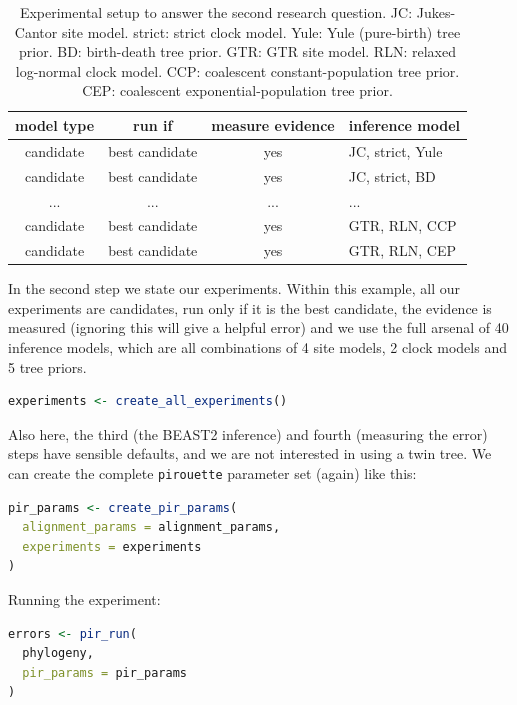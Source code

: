 \documentclass{article}
\begin{document}
\begin{table}
  \begin{tabular}{ | c | c | c | l | }
    \hline
    \textbf{model type} & \textbf{run if} & \textbf{measure evidence} & \textbf{inference model} \\ 
    \hline
    candidate & best candidate & yes & JC, strict, Yule \\
    candidate & best candidate & yes & JC, strict, BD \\
    ...       & ...            & ... & ... \\
    candidate & best candidate & yes & GTR, RLN, CCP \\
    candidate & best candidate & yes & GTR, RLN, CEP \\
    \hline
  \end{tabular}
  \caption{
    Experimental setup to answer the second research question.
    JC: Jukes-Cantor site model.
    strict: strict clock model.
    Yule: Yule (pure-birth) tree prior.
    BD: birth-death tree prior.
    GTR: GTR site model.
    RLN: relaxed log-normal clock model.
    CCP: coalescent constant-population tree prior.
    CEP: coalescent exponential-population tree prior.
  }
\end{table}

In the second step we state our experiments. 
Within this example, all our experiments are candidates,
run only if it is the best candidate, the evidence is measured (ignoring
this will give a helpful error) and we use the full arsenal of 
40 inference models, which are all combinations of 4 site 
models, 2 clock models and 5 tree priors.

\begin{lstlisting}[language=R, floatplacement=H, frame=single]
experiments <- create_all_experiments()
\end{lstlisting}

Also here, the third (the BEAST2 inference) and fourth (measuring the error)
steps have sensible defaults, and we are not
interested in using a twin tree. We can create the complete
\verb;pirouette; parameter set (again) like this:

\begin{lstlisting}[language=R, floatplacement=H, frame=single]
pir_params <- create_pir_params(
  alignment_params = alignment_params,
  experiments = experiments
)
\end{lstlisting}

Running the experiment:

\begin{lstlisting}[language=R, floatplacement=H, frame=single]
errors <- pir_run(
  phylogeny,
  pir_params = pir_params
)
\end{lstlisting}
\end{document}
